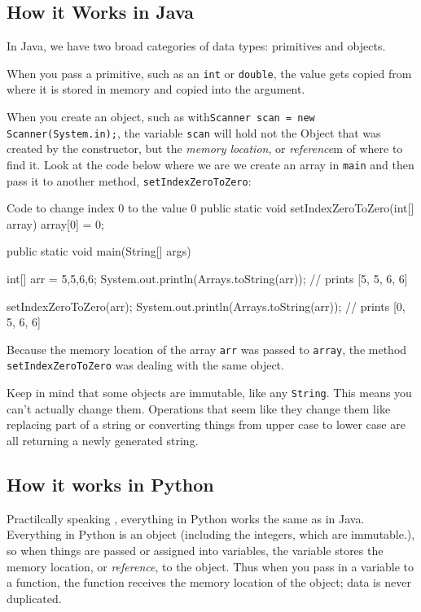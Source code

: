\subsection{How it Works in Java}
In Java, we have two broad categories of data types: primitives and objects.

When you pass a primitive, such as an \texttt{int} or \texttt{double}, the value gets copied from where it is stored in memory and copied into the argument.

When you create an object, such as with\texttt{Scanner scan = new Scanner(System.in);}, 
the variable \texttt{scan} will hold not the Object that was created by the constructor, but the \textit{memory location}, or  \textit{reference}m of where to find it.
Look at the code below where we are we create an array in \texttt{main} and then pass it to another method, \texttt{setIndexZeroToZero}:

\begin{javacode}{Code to change index 0 to the value 0}
public static void setIndexZeroToZero(int[] array) {
	array[0] = 0;
}

public static void main(String[] args) {
	int[] arr = {5,5,6,6};
	System.out.println(Arrays.toString(arr));
	// prints [5, 5, 6, 6]
	
	setIndexZeroToZero(arr);
	System.out.println(Arrays.toString(arr));
	// prints [0, 5, 6, 6]
}

\end{javacode}

Because the memory location of the array \texttt{arr} was passed to \texttt{array}, the method \texttt{setIndexZeroToZero} was dealing with the same object. 


Keep in mind that some objects are immutable, like any \texttt{String}.  This means you can't actually change them.  Operations that seem like they change them like replacing part of a string or converting things from upper case to lower case are all returning a newly generated string.
\subsection{How it works in Python}

Practilcally  speaking , everything in Python works the same as in Java.
Everything in Python is an object (including the integers, which are immutable.), so when things are passed or assigned into variables, the variable stores the memory location, or \textit{reference}, to the object.  
Thus when you pass in a variable to a function, the function receives the memory location of the object; data is never duplicated.
